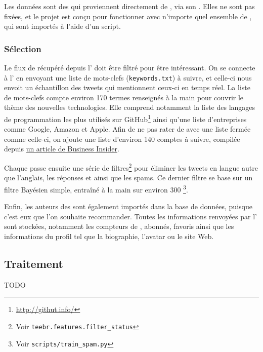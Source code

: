 Les données sont des \tweets{} qui proviennent directement de \twt{}, via son
\api{}. Elles ne sont pas fixées, et le projet est conçu pour fonctionner avec
n’importe quel ensemble de \tweets{}, qui sont importés à l’aide d’un script.

\subsubsection{Sélection}

Le flux de \tweets{} récupéré depuis l’\api{} \twt{} doit être filtré pour être
intéressant. On se connecte à l’\api{} en envoyant une liste de mots-clefs
(\verb|keywords.txt|) à suivre, et celle-ci nous envoit un échantillon des
tweets qui mentionnent ceux-ci en temps réel. La liste de mots-clefs compte
environ 170 termes renseignés à la main pour couvrir le thème des nouvelles
technologies. Elle comprend notamment la liste des langages de programmation
les plus utilisés sur GitHub\footnote{\url{http://githut.info/}} ainsi qu’une
liste d’entreprises comme Google, Amazon et Apple. Afin de ne pas rater de
\tweets{} avec une liste fermée comme celle-ci, on ajoute une liste d’environ
140 comptes à suivre, compilée depuis
  \href{http://uk.businessinsider.com/100-best-tech-people-on-twitter-2014-2014-11?op=1?r=US}{un
    article de Business Insider}.

Chaque \tweet{} passe ensuite une série de filtres\footnote{Voir
\verb|teebr.features.filter_status|} pour éliminer les tweets en langue autre
que l’anglais, les réponses et \rts{} ainsi que les spams. Ce dernier filtre se
base sur un filtre Bayésien simple, entraîné à la main sur environ 300
\tweets{}\footnote{Voir \verb|scripts/train_spam.py|}.

Enfin, les auteurs des \tweets{} sont également importés dans la base de
données, puisque c’est eux que l’on souhaite recommander. Toutes les
informations renvoyées par l’\api{} sont stockées, notamment les compteurs de
\tweets{}, abonnés, favoris ainsi que les informations du profil tel que la
biographie, l’avatar ou le site Web.

\subsection{Traitement}

TODO
